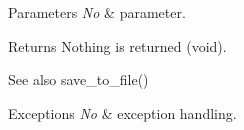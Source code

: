 \begin{DoxyParams}{Parameters}
{\em No} & parameter. \\
\hline
\end{DoxyParams}
\begin{DoxyReturn}{Returns}
Nothing is returned (void). 
\end{DoxyReturn}
\begin{DoxySeeAlso}{See also}
save\+\_\+to\+\_\+file() 
\end{DoxySeeAlso}

\begin{DoxyExceptions}{Exceptions}
{\em No} & exception handling. \\
\hline
\end{DoxyExceptions}
